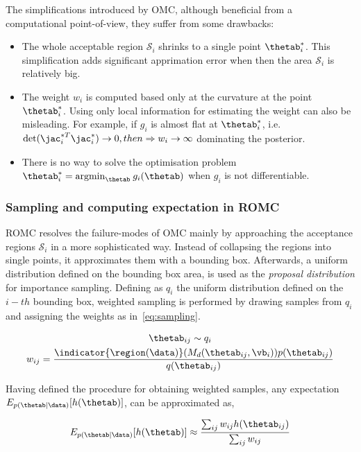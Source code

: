The simplifications introduced by OMC, although beneficial from a
computational point-of-view, they suffer from some drawbacks:

\begin{itemize}
\item The whole acceptable region $\mathcal{S}_i$
  shrinks to a single point $\thetab_i^*$. This simplification adds
  significant apprimation error when then the area $\mathcal{S}_i$ is relatively big.
\item The weight $w_i$ is computed based only at the curvature at the
  point $\thetab_i^*$. Using only local information for estimating the weight can also be misleading. For example, if $g_i$ is almost flat at $\thetab_i^*$, i.e. $\text{det}(\jac_i^{*T}\jac_i^*) \rightarrow 0, then \Rightarrow w_i
  \rightarrow \infty$ dominating the posterior.
\item There is no way to solve the optimisation problem
  $\thetab_i^* = \text{argmin}_{\thetab} \: g_i(\thetab)$ when $g_i$
  is not differentiable.
\end{itemize}

\subsubsection{Sampling and computing expectation in ROMC}

ROMC resolves the failure-modes of OMC mainly by approaching the
acceptance regions $\mathcal{S}_i$ in a more sophisticated way.
Instead of collapsing the regions into single points, it approximates
them with a bounding box. Afterwards, a uniform distribution defined
on the bounding box area, is used as the \emph{proposal distribution}
for importance sampling. Defining as $q_i$ the uniform distribution
defined on the $i-th$ bounding box, weighted sampling is performed by
drawing samples from $q_i$ and assigning the weights as
in~\eqref{eq:sampling}.

\begin{gather}
  \thetab_{ij} \sim q_i \\  \label{eq:sampling}
  w_{ij} = \frac{\indicator{\region(\data)}(M_d(\thetab_{ij}, \vb_i)) p(\thetab_{ij})}{q(\thetab_{ij})}
\end{gather}

\noindent

Having defined the procedure for obtaining weighted samples, any
expectation $E_{p(\thetab|\data)}[h(\thetab)]$, can be approximated
as,

\begin{equation} \label{eq:expectation}
  E_{p(\thetab|\data)}[h(\thetab)] \approx \frac{\sum_{ij} w_{ij} h(\thetab_{ij})}{\sum_{ij} w_{ij}}
\end{equation}

